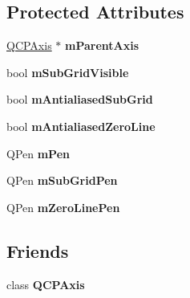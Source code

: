 \subsection*{Protected Attributes}
\begin{DoxyCompactItemize}
\item 
\hypertarget{classQCPGrid_a9a8a76731e6e737b65b929fd1995cc88}{\hyperlink{classQCPAxis}{Q\-C\-P\-Axis} $\ast$ {\bfseries m\-Parent\-Axis}}\label{classQCPGrid_a9a8a76731e6e737b65b929fd1995cc88}

\item 
\hypertarget{classQCPGrid_a4e4a0400d6319bb44c06341f6298c87b}{bool {\bfseries m\-Sub\-Grid\-Visible}}\label{classQCPGrid_a4e4a0400d6319bb44c06341f6298c87b}

\item 
\hypertarget{classQCPGrid_a71b7051f833f0c5de3094998d6afdd87}{bool {\bfseries m\-Antialiased\-Sub\-Grid}}\label{classQCPGrid_a71b7051f833f0c5de3094998d6afdd87}

\item 
\hypertarget{classQCPGrid_a8c0df56ae86440408c050895dcdb922b}{bool {\bfseries m\-Antialiased\-Zero\-Line}}\label{classQCPGrid_a8c0df56ae86440408c050895dcdb922b}

\item 
\hypertarget{classQCPGrid_a1cdc4a3bccf6a40c2d4360def9fefa40}{Q\-Pen {\bfseries m\-Pen}}\label{classQCPGrid_a1cdc4a3bccf6a40c2d4360def9fefa40}

\item 
\hypertarget{classQCPGrid_aa9004bc139ad3ea92629f0aaae81d83f}{Q\-Pen {\bfseries m\-Sub\-Grid\-Pen}}\label{classQCPGrid_aa9004bc139ad3ea92629f0aaae81d83f}

\item 
\hypertarget{classQCPGrid_a379481871f17655c27eda30af233554f}{Q\-Pen {\bfseries m\-Zero\-Line\-Pen}}\label{classQCPGrid_a379481871f17655c27eda30af233554f}

\end{DoxyCompactItemize}
\subsection*{Friends}
\begin{DoxyCompactItemize}
\item 
\hypertarget{classQCPGrid_af123edeca169ec7a31958a1d714e1a8a}{class {\bfseries Q\-C\-P\-Axis}}\label{classQCPGrid_af123edeca169ec7a31958a1d714e1a8a}

\end{DoxyCompactItemize}


